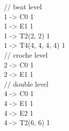 // beat level\\
1 -> C0                1\\
1 -> E1                1\\
1 -> T2(2, 2)          1\\
1 -> T4(4, 4, 4, 4)    1\\

// croche level\\
2 -> C0                1\\
2 -> E1                1\\

// double level\\
4 -> C0                1\\
4 -> E1                1\\
4 -> E2                1\\
4 -> T2(6, 6)          1\\

